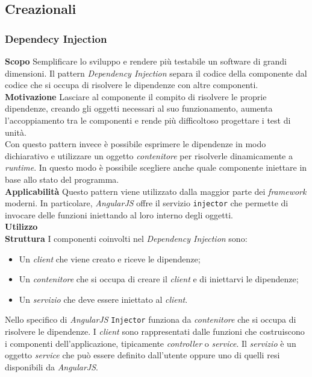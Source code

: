 \subsection{Creazionali}
\subsubsection{Dependecy Injection}
\textbf{Scopo}	Semplificare lo sviluppo e rendere più testabile un software di grandi dimensioni. Il pattern \textit{Dependency Injection} separa il codice della componente dal codice che si occupa di risolvere le dipendenze con altre componenti.
\\ 
\textbf{Motivazione}	Lasciare al componente il compito di risolvere le proprie dipendenze, creando gli oggetti necessari al suo funzionamento, aumenta l'accoppiamento tra le componenti e rende più difficoltoso progettare i test di unità.
\\ Con questo pattern invece è possibile esprimere le dipendenze in modo dichiarativo e utilizzare un oggetto \textit{contenitore} per risolverle dinamicamente a \textit{runtime}. In questo modo è possibile scegliere anche quale componente iniettare in base allo stato del programma.
\\
\textbf{Applicabilità}	Questo pattern viene utilizzato dalla maggior parte dei \textit{framework} moderni. In particolare, \textit{AngularJS} offre il servizio \texttt{injector} che permette di invocare delle funzioni iniettando al loro interno degli oggetti.
\\
\textbf{Utilizzo}
\\
\textbf{Struttura}	I componenti coinvolti nel \textit{Dependency Injection} sono:
	\begin{itemize}
		\item Un \textit{client} che viene creato e riceve le dipendenze;
		\item Un \textit{contenitore} che si occupa di creare il \textit{client} e di iniettarvi le dipendenze;
		\item Un \textit{servizio} che deve essere iniettato al \textit{client}.
	\end{itemize}
Nello specifico di \textit{AngularJS} \texttt{Injector} funziona da \textit{contenitore} che si occupa di risolvere le dipendenze. I \textit{client} sono rappresentati dalle funzioni che costruiscono i componenti dell'applicazione, tipicamente \textit{controller} o \textit{service}. Il \textit{servizio} è un oggetto \textit{service} che può essere definito dall'utente oppure uno di quelli resi disponibili da \textit{AngularJS}.
